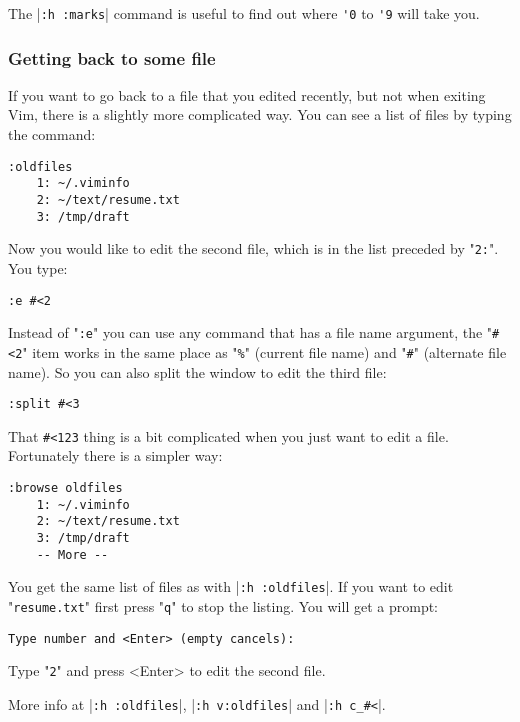 The |\verb!:h :marks!| command is useful to find out where \verb!'0! to \verb!'9! will take you.

\subsubsection{Getting back to some file}
If you want to go back to a file that you edited recently, but not when exiting Vim, there is a slightly more complicated way.
You can see a list of files by typing the command:

\begin{Verbatim}[samepage=true]
 :oldfiles
    1: ~/.viminfo 
    2: ~/text/resume.txt 
    3: /tmp/draft 
\end{Verbatim}

Now you would like to edit the second file, which is in the list preceded by "\verb!2:!".
You type:

\begin{Verbatim}[samepage=true]
 :e #<2
\end{Verbatim}

Instead of "\verb!:e!" you can use any command that has a file name argument, the "\verb!#<2!" item works in the same place as "\verb!%!" (current file name) and "\verb!#!" (alternate file name).
So you can also split the window to edit the third file:

\begin{Verbatim}[samepage=true]
 :split #<3
\end{Verbatim}

That \verb!#<123! thing is a bit complicated when you just want to edit a file.
Fortunately there is a simpler way:

\begin{Verbatim}[samepage=true]
 :browse oldfiles
    1: ~/.viminfo 
    2: ~/text/resume.txt 
    3: /tmp/draft 
    -- More --
\end{Verbatim}

You get the same list of files as with |\verb!:h :oldfiles!|.
If you want to edit "\verb!resume.txt!" first press "\verb!q!" to stop the listing.
You will get a prompt:

\begin{Verbatim}[samepage=true]
    Type number and <Enter> (empty cancels): 
\end{Verbatim}

Type "\verb!2!" and press <Enter> to edit the second file.

More info at |\verb!:h :oldfiles!|, |\verb!:h v:oldfiles!| and |\verb!:h c_#<!|.

